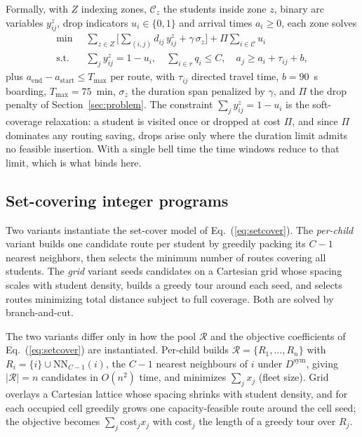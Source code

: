 \documentclass[runningheads]{llncs}
\begin{document}
Formally, with $Z$ indexing zones, $\mathcal{C}_z$ the students inside
zone $z$, binary arc variables $y^z_{ij}$, drop indicators
$u_i\in\{0,1\}$ and arrival times $a_i\ge0$, each zone solves
\begin{align}
\min \;\; & \sum_{z\in Z}\Big[\sum_{(i,j)} d_{ij}\,y^z_{ij}
  + \gamma\,\sigma_z\Big] + \Pi\sum_{i\in\mathcal{C}} u_i
\label{eq:cvrptw}\\
\text{s.t.}\;\; & \textstyle\sum_{j} y^z_{ij} = 1-u_i,\quad
\sum_{i\in r} q_i \le C,\quad
a_j \ge a_i + \tau_{ij} + b,
\nonumber
\end{align}
plus $a_{\text{end}}-a_{\text{start}}\le T_{\max}$ per route, with
$\tau_{ij}$ directed travel time, $b=90$~s boarding, $T_{\max}=75$~min,
$\sigma_z$ the duration span penalized by $\gamma$, and $\Pi$ the drop
penalty of Section~\ref{sec:problem}. The constraint
$\sum_j y^z_{ij}=1-u_i$ is the soft-coverage relaxation: a student is
visited once or dropped at cost $\Pi$, and since $\Pi$ dominates any
routing saving, drops arise only where the duration limit admits no
feasible insertion. With a single bell time the time windows reduce to
that limit, which is what binds here.

\subsection{Set-covering integer programs}
Two variants instantiate the set-cover model of
Eq.~(\ref{eq:setcover}). The \emph{per-child} variant builds one
candidate route per student by greedily packing its $C-1$ nearest
neighbors, then selects the minimum number of routes covering all
students. The \emph{grid} variant seeds candidates on a Cartesian grid
whose spacing scales with student density, builds a greedy tour around
each seed, and selects routes minimizing total distance subject to full
coverage. Both are solved by branch-and-cut.

The two variants differ only in how the pool $\mathcal{R}$ and the
objective coefficients of Eq.~(\ref{eq:setcover}) are instantiated.
Per-child builds $\mathcal{R}=\{R_1,\dots,R_n\}$ with
$R_i=\{i\}\cup\mathrm{NN}_{C-1}(i)$, the $C-1$ nearest neighbours of
$i$ under $D^{\mathrm{sym}}$, giving $|\mathcal{R}|=n$ candidates in
$O(n^2)$ time, and minimizes $\sum_j x_j$ (fleet size). Grid overlays a
Cartesian lattice whose spacing shrinks with student density, and for
each occupied cell greedily grows one capacity-feasible route around
the cell seed; the objective becomes
$\sum_j \mathrm{cost}_j x_j$ with $\mathrm{cost}_j$ the length of a
greedy tour over $R_j$.
\end{document}
